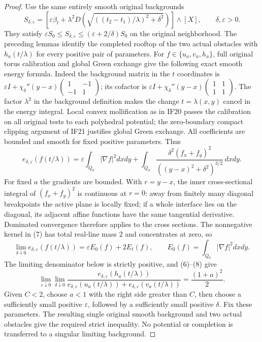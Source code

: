 \documentclass{article}
\begin{document}
\begin{proof}
Use the same entirely smooth original backgrounds
\[
 S_{\delta,\varepsilon}
 =\left[\varepsilon\beta_t+
 \lambda^2D\!\left(\sqrt{((t_2-t_1)/\lambda)^2+\delta^2}\right)
                                                   \right]\wedge[X],
 \qquad\delta,\varepsilon>0.
\]
They satisfy
$\varepsilon S_0\le S_{\delta,\varepsilon}
\le(\varepsilon+2/\delta)S_0$ on the original neighborhood.
The preceding lemmas identify the completed rooftop of the two actual
obstacles with $h_a(t/\lambda)$ for every positive pair of parameters.
For $f\in\{u_a,v_a,h_a\}$, full original torus calibration and
global Green exchange give the following exact smooth energy formula.
Indeed the background matrix in the $t$ coordinates is
$\varepsilon I+\chi_\delta''(y-x)
\left(\begin{smallmatrix}1&-1\\-1&1\end{smallmatrix}\right)$;
its cofactor is
$\varepsilon I+\chi_\delta''(y-x)
\left(\begin{smallmatrix}1&1\\1&1\end{smallmatrix}\right)$.
The factor $\lambda^2$ in the background definition makes the change
$t=\lambda(x,y)$ cancel in the energy integral. Local convex mollification
as in IF20 passes the calibration on all original tests to each
polyhedral potential; the zero-boundary compact clipping argument of
IF21 justifies global Green exchange. All coefficients are bounded and
smooth for fixed positive parameters. Thus
\[
 e_{\delta,\varepsilon}(f(t/\lambda))
 =\varepsilon\int_{Q_0}|\nabla f|^2dxdy
 +\int_{Q_0}\frac{\delta^2(f_x+f_y)^2}
                       {((y-x)^2+\delta^2)^{3/2}}\,dxdy.    \tag{7}
\]
For fixed $a$ the gradients are bounded. With $r=y-x$, the inner
cross-sectional integral of $(f_x+f_y)^2$ is continuous at $r=0$:
away from finitely many diagonal breakpoints the active plane is locally
fixed; if a whole interface lies on the diagonal, its adjacent affine
functions have the same tangential derivative. Dominated convergence
therefore applies to the cross sections. The nonnegative kernel in (7)
has total real-line mass $2$ and concentrates at zero, so
\[
 \lim_{\delta\downarrow0}e_{\delta,\varepsilon}(f(t/\lambda))
              =\varepsilon E_0(f)+2E_\ell(f),\qquad
 E_0(f)=\int_{Q_0}|\nabla f|^2dxdy.                         \tag{8}
\]
The limiting denominator below is strictly positive, and (6)--(8) give
\[
 \lim_{\varepsilon\downarrow0}\lim_{\delta\downarrow0}
 \frac{e_{\delta,\varepsilon}(h_a(t/\lambda))}
 {e_{\delta,\varepsilon}(u_a(t/\lambda))+
                         e_{\delta,\varepsilon}(v_a(t/\lambda))}
                         =\frac{(1+a)^2}{2}.                \tag{9}
\]
Given $C<2$, choose $a<1$ with the right side greater than $C$,
then choose a sufficiently small positive $\varepsilon$, followed by
a sufficiently small positive $\delta$. Fix these parameters. The
resulting single original smooth background and two actual obstacles
give the required strict inequality. No potential or completion is
transferred to a singular limiting background.
\end{proof}
\end{document}
